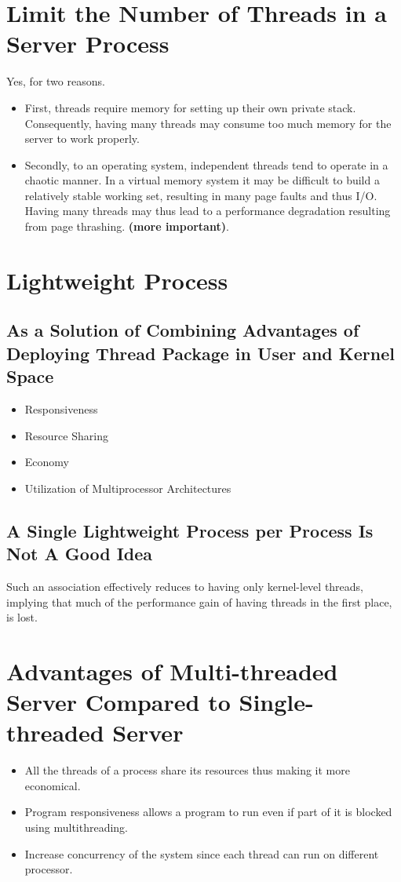 \documentclass[11pt,a4paper]{report}
\begin{document}
  	\section{Limit the Number of Threads in a Server Process}
  	Yes, for two reasons. 
  	\begin{itemize}
  		\item First, threads require memory for setting up their own private stack. Consequently, having many threads may consume too much memory for the server to work properly.
  		\item Secondly, to an operating system, independent threads tend to operate in a chaotic manner. In a virtual memory system it may be difficult to build a relatively stable working set, resulting in many page faults and thus I/O. Having many threads may thus lead to a performance degradation resulting from page thrashing. \textbf{(more important)}.
  	\end{itemize}
  	
  	\section{Lightweight Process}
  		\subsection{As a Solution of Combining Advantages of Deploying Thread Package in User and Kernel Space}
  		\begin{itemize}
  			\item Responsiveness
  			\item Resource Sharing
  			\item Economy
  			\item Utilization of Multiprocessor Architectures
  		\end{itemize}
  		\subsection{A Single Lightweight Process per Process Is Not A Good Idea}
  		Such an association effectively reduces to having only kernel-level
threads, implying that much of the performance gain of having threads in the
first place, is lost.

	\section{Advantages of Multi-threaded Server Compared to Single-threaded Server}
	\begin{itemize}
		\item All the threads of a process share its resources thus making it more economical.
		\item Program responsiveness allows a program to run even if part of it is blocked using multithreading.
		\item Increase concurrency of the system since each thread can run on different processor.
	\end{itemize}
\end{document}
